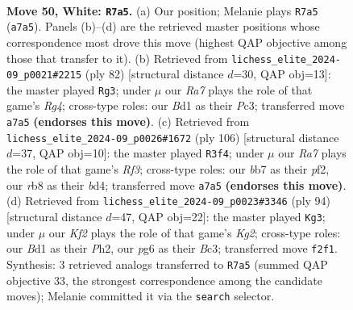 \documentclass[11pt]{article}
\begin{document}
\clearpage

\begin{figure}[p]\centering
\begin{subfigure}{0.46\textwidth}\centering
\resizebox{\linewidth}{!}{%
\newchessgame
\chessboard[
  setfen={1r2r3/Rb3p1k/6p1/1p6/7P/1P6/2PN1K2/R2B4 w - - 0 50},
  showmover=false,
  pgfstyle=straightmove, color=movearrow, markmove={a7-a5}
]}
\caption{}
\end{subfigure}\hfill
\begin{subfigure}{0.46\textwidth}\centering
\resizebox{\linewidth}{!}{%
\newchessgame
\chessboard[
  setfen={8/4k3/1p2r1b1/p7/5RR1/P1P4p/1P1K3P/8 w - - 3 42},
  showmover=false,
  pgfstyle=straightmove, color=movearrow, markmove={g4-g3}
]}
\caption{}
\end{subfigure}
\\[4pt]
\begin{subfigure}{0.46\textwidth}\centering
\resizebox{\linewidth}{!}{%
\newchessgame
\chessboard[
  setfen={r7/7r/3pB2k/3P1R2/p2b3P/5R2/KP3p2/8 w - - 8 54},
  showmover=false,
  pgfstyle=straightmove, color=movearrow, markmove={f3-f4}
]}
\caption{}
\end{subfigure}\hfill
\begin{subfigure}{0.46\textwidth}\centering
\resizebox{\linewidth}{!}{%
\newchessgame
\chessboard[
  setfen={8/3k4/4p3/P1pr4/5rP1/2BbR3/6KP/4R3 w - - 1 48},
  showmover=false,
  pgfstyle=straightmove, color=movearrow, markmove={g2-g3}
]}
\caption{}
\end{subfigure}
\caption{\textbf{Move 50, White: \texttt{R7a5}.} (a) Our position; Melanie plays \texttt{R7a5} (\texttt{a7a5}). Panels (b)--(d) are the retrieved master positions whose correspondence most drove this move (highest QAP objective among those that transfer to it). (b) Retrieved from \texttt{lichess\_elite\_2024-09\_p0021\#2215} (ply 82) [structural distance $d$=30, QAP obj=13]: the master played \texttt{Rg3}; under $\mu$ our \emph{Ra7} plays the role of that game's \emph{Rg4}; cross-type roles: our \emph{B}d1 as their \emph{P}c3; transferred move \texttt{a7a5} \textbf{(endorses this move)}. (c) Retrieved from \texttt{lichess\_elite\_2024-09\_p0026\#1672} (ply 106) [structural distance $d$=37, QAP obj=10]: the master played \texttt{R3f4}; under $\mu$ our \emph{Ra7} plays the role of that game's \emph{Rf3}; cross-type roles: our \emph{b}b7 as their \emph{p}f2, our \emph{r}b8 as their \emph{b}d4; transferred move \texttt{a7a5} \textbf{(endorses this move)}. (d) Retrieved from \texttt{lichess\_elite\_2024-09\_p0023\#3346} (ply 94) [structural distance $d$=47, QAP obj=22]: the master played \texttt{Kg3}; under $\mu$ our \emph{Kf2} plays the role of that game's \emph{Kg2}; cross-type roles: our \emph{B}d1 as their \emph{P}h2, our \emph{p}g6 as their \emph{B}c3; transferred move \texttt{f2f1}. Synthesis: 3 retrieved analogs transferred to \texttt{R7a5} (summed QAP objective 33, the strongest correspondence among the candidate moves); Melanie committed it via the \texttt{search} selector.}
\label{fig:thought-m98}
\end{figure}
\end{document}
